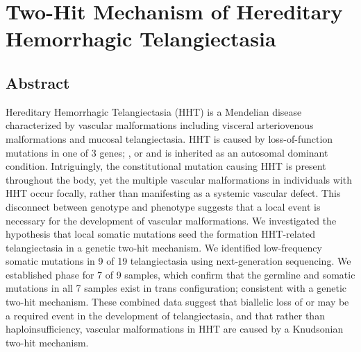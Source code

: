 \chapter{Two-Hit Mechanism of Hereditary Hemorrhagic Telangiectasia}
\label{chap:guide}

\section{Abstract}
Hereditary Hemorrhagic Telangiectasia (HHT) is a Mendelian disease characterized by vascular malformations including visceral arteriovenous malformations and mucosal telangiectasia. HHT is caused by loss-of-function mutations in one of 3 genes; ,  or  and is inherited as an autosomal dominant condition. Intriguingly, the constitutional mutation causing HHT is present throughout the body, yet the multiple vascular malformations in individuals with HHT occur focally, rather than manifesting as a systemic vascular defect. This disconnect between genotype and phenotype suggests that a local event is necessary for the development of vascular malformations. We investigated the hypothesis that local somatic mutations seed the formation HHT-related telangiectasia in a genetic two-hit mechanism. We identified low-frequency somatic mutations in 9 of 19 telangiectasia using next-generation sequencing. We established phase for 7 of 9 samples, which confirm that the germline and somatic mutations in all 7 samples exist in trans configuration; consistent with a genetic two-hit mechanism. These combined data suggest that biallelic loss of  or  may be a required event in the development of telangiectasia, and that rather than haploinsufficiency, vascular malformations in HHT are caused by a Knudsonian two-hit mechanism.

